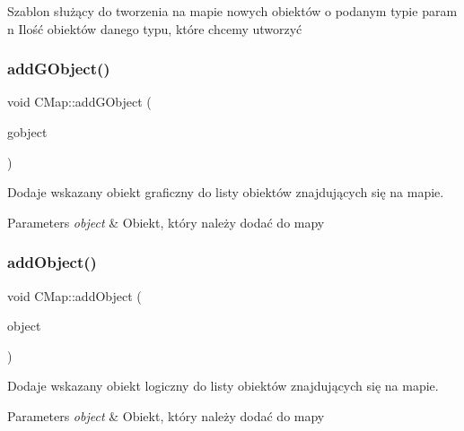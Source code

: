 Szablon służący do tworzenia na mapie nowych obiektów o podanym typie param n Ilość obiektów danego typu, które chcemy utworzyć 

\mbox{\label{class_c_map_adfb0980e5f2153cd6b287a010795c6b4}} 
\subsubsection{\texorpdfstring{add\+G\+Object()}{addGObject()}}
{\footnotesize\ttfamily void C\+Map\+::add\+G\+Object (\begin{DoxyParamCaption}\item[{\mbox{\hyperlink{class_c_g_object}{C\+G\+Object}} $\ast$}]{gobject }\end{DoxyParamCaption})}



Dodaje wskazany obiekt graficzny do listy obiektów znajdujących się na mapie. 


\begin{DoxyParams}{Parameters}
{\em object} & Obiekt, który należy dodać do mapy \\
\hline
\end{DoxyParams}
\mbox{\label{class_c_map_a4b22b964e9d16e428c0a56b15b235c82}} 
\subsubsection{\texorpdfstring{add\+Object()}{addObject()}}
{\footnotesize\ttfamily void C\+Map\+::add\+Object (\begin{DoxyParamCaption}\item[{\mbox{\hyperlink{class_c_object}{C\+Object}} $\ast$}]{object }\end{DoxyParamCaption})}



Dodaje wskazany obiekt logiczny do listy obiektów znajdujących się na mapie. 


\begin{DoxyParams}{Parameters}
{\em object} & Obiekt, który należy dodać do mapy \\
\hline
\end{DoxyParams}
\mbox{\label{class_c_map_a55bccb7dd240a21de6e5d12df054d0cb}} 
